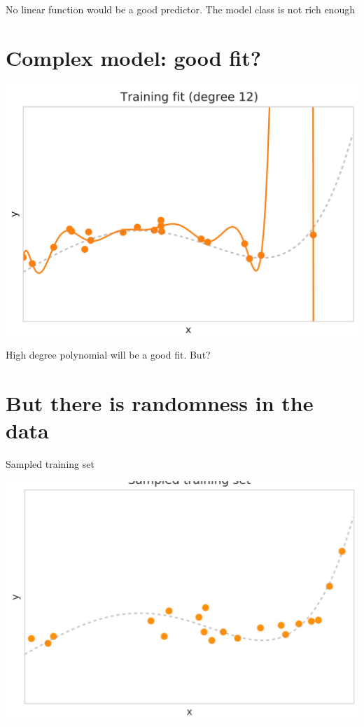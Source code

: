 \documentclass[10pt]{article}
\begin{document}
No linear function would be a good predictor. The model class is not rich enough

\section*{Complex model: good fit?}
\begin{center}
\includegraphics[max width=\textwidth]{2023_12_30_442f876157646883c2c9g-07}
\end{center}

High degree polynomial will be a good fit. But?

\section*{But there is randomness in the data}
Sampled training set

\begin{center}
\includegraphics[max width=\textwidth]{2023_12_30_442f876157646883c2c9g-08}
\end{center}
\end{document}
